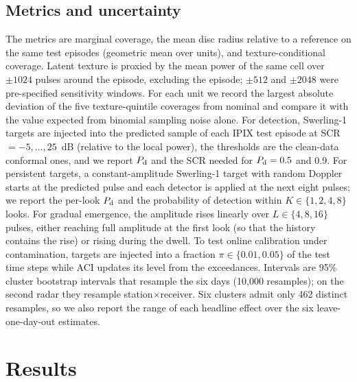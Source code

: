 \documentclass[journal]{IEEEtran}
\begin{document}
\subsection{Metrics and uncertainty}
The metrics are marginal coverage, the mean disc radius relative to a reference on the same test episodes (geometric mean over units), and texture-conditional coverage. Latent texture is proxied by the mean power of the same cell over $\pm1024$ pulses around the episode, excluding the episode; $\pm512$ and $\pm2048$ were pre-specified sensitivity windows. For each unit we record the largest absolute deviation of the five texture-quintile coverages from nominal and compare it with the value expected from binomial sampling noise alone. For detection, Swerling-1 targets are injected into the predicted sample of each IPIX test episode at SCR $=-5,\dots,25$~dB (relative to the local power), the thresholds are the clean-data conformal ones, and we report $P_{\rm d}$ and the SCR needed for $P_{\rm d}=0.5$ and $0.9$. For persistent targets, a constant-amplitude Swerling-1 target with random Doppler starts at the predicted pulse and each detector is applied at the next eight pulses; we report the per-look $P_{\rm d}$ and the probability of detection within $K\in\{1,2,4,8\}$ looks. For gradual emergence, the amplitude rises linearly over $L\in\{4,8,16\}$ pulses, either reaching full amplitude at the first look (so that the history contains the rise) or rising during the dwell. To test online calibration under contamination, targets are injected into a fraction $\pi\in\{0.01,0.05\}$ of the test time steps while ACI updates its level from the exceedances. Intervals are 95\% cluster bootstrap intervals that resample the six days (10,000 resamples); on the second radar they resample station$\times$receiver. Six clusters admit only 462 distinct resamples, so we also report the range of each headline effect over the six leave-one-day-out estimates.

\section{Results}
\end{document}
